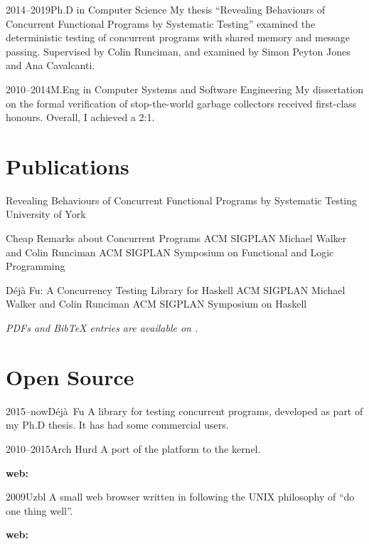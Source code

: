 \documentclass[a4paper]{barrucadu-cv}
\newcommand{\range}[2]{#1–#2}
\newcommand{\orange}[1]{\range{#1}{now}}
\begin{document}
\begin{cventry}{\range{2014}{2019}}{Ph.D in Computer Science}
  My thesis ``Revealing Behaviours of Concurrent Functional Programs
  by Systematic Testing'' examined the deterministic testing of
  concurrent programs with shared memory and message passing.
  Supervised by Colin Runciman, and examined by Simon Peyton Jones and
  Ana Cavalcanti.
\end{cventry}

\begin{cventry}{\range{2010}{2014}}{M.Eng in Computer Systems and Software Engineering}
  My dissertation on the formal verification of stop-the-world garbage
  collectors received first-class honours.  Overall, I achieved a 2:1.
\end{cventry}

\section{Publications}

\def\entryheadinglevel{subsection}

  {Revealing Behaviours of Concurrent Functional Programs by Systematic Testing}
  {University of York}

  {Cheap Remarks about Concurrent Programs}
  {ACM SIGPLAN}
  {Michael Walker and Colin Runciman}
  {ACM SIGPLAN Symposium on Functional and Logic Programming}

  {Déjà Fu: A Concurrency Testing Library for Haskell}
  {ACM SIGPLAN}
  {Michael Walker and Colin Runciman}
  {ACM SIGPLAN Symposium on Haskell}

\textit{PDFs and BibTeX entries are available on .}

\section{Open Source}

\begin{cventry}{\orange{2015}}{D\'{e}j\`{a}~Fu}
  A library for testing concurrent  programs,
  developed as part of my Ph.D thesis. It has had some commercial users.

  \textbf{\small{}}
\end{cventry}

\begin{cventry}{\range{2010}{2015}}{Arch Hurd}
  A port of the  platform to the
   kernel.

  \textbf{\small web: }
\end{cventry}

\begin{cventry}{2009}{Uzbl}
  A small web browser written in  following the UNIX
  philosophy of ``do one thing well''.

  \textbf{\small web: }
\end{cventry}
\end{document}
